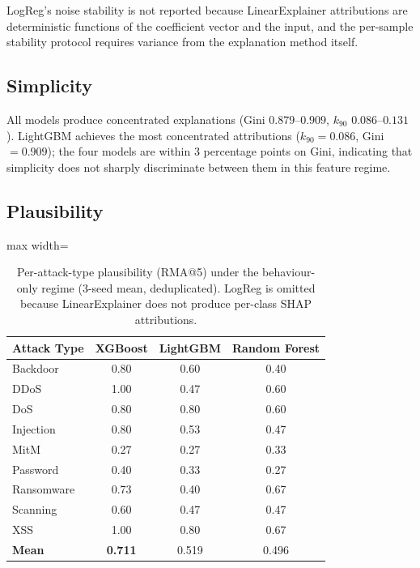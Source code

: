 \documentclass[12pt,a4paper]{report}
\begin{document}
LogReg's noise stability is not reported because LinearExplainer attributions are deterministic functions of the coefficient vector and the input, and the per-sample stability protocol requires variance from the explanation method itself.

\subsection{Simplicity}
\label{sec:simp-results}

All models produce concentrated explanations (Gini $0.879$--$0.909$, $k_{90}$ $0.086$--$0.131$). LightGBM achieves the most concentrated attributions ($k_{90} = 0.086$, Gini $= 0.909$); the four models are within 3 percentage points on Gini, indicating that simplicity does not sharply discriminate between them in this feature regime.

\subsection{Plausibility}
\label{sec:plaus-results}

\begin{table}[H]
\centering
\caption{Per-attack-type plausibility (RMA@5) under the behaviour-only regime (3-seed mean, deduplicated). LogReg is omitted because LinearExplainer does not produce per-class SHAP attributions.}
\label{tab:plausibility}
\begin{adjustbox}{max width=\textwidth}
\begin{tabular}{lccc}
\toprule
\textbf{Attack Type} & \textbf{XGBoost} & \textbf{LightGBM} & \textbf{Random Forest} \\
\midrule
Backdoor & 0.80 & 0.60 & 0.40 \\
DDoS & 1.00 & 0.47 & 0.60 \\
DoS & 0.80 & 0.80 & 0.60 \\
Injection & 0.80 & 0.53 & 0.47 \\
MitM & 0.27 & 0.27 & 0.33 \\
Password & 0.40 & 0.33 & 0.27 \\
Ransomware & 0.73 & 0.40 & 0.67 \\
Scanning & 0.60 & 0.47 & 0.47 \\
XSS & 1.00 & 0.80 & 0.67 \\
\midrule
\textbf{Mean} & \textbf{0.711} & 0.519 & 0.496 \\
\bottomrule
\end{tabular}
\end{adjustbox}
\end{table}
\end{document}
